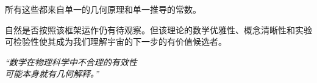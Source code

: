 所有这些都来自单一的几何原理和单一推导的常数。

自然是否按照该框架运作仍有待观察。但该理论的数学优雅性、概念清晰性和实验可检验性使其成为我们理解宇宙的下一步的有价值候选者。

\vspace{1cm}

\begin{center}
\textit{``数学在物理科学中不合理的有效性\\
可能本身就有几何解释。''}
\end{center}

